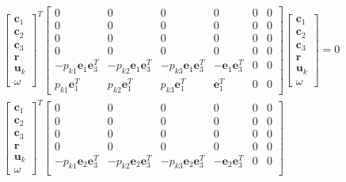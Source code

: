 \documentclass{article}
\begin{document}
\begin{align}
    \begin{bmatrix}
        \mathbf{c}_1 \\
        \mathbf{c}_2 \\
        \mathbf{c}_3 \\
        \mathbf{r} \\
        \mathbf{u}_k \\
        \omega
    \end{bmatrix}^T
    \begin{bmatrix}
        0 & 0 & 0 & 0 & 0 & 0 \\
        0 & 0 & 0 & 0 & 0 & 0 \\
        0 & 0 & 0 & 0 & 0 & 0 \\
        0 & 0 & 0 & 0 & 0 & 0 \\
        -p_{k1}\mathbf{e}_1\mathbf{e}_3^T & -p_{k2}\mathbf{e}_1\mathbf{e}_3^T & -p_{k3}\mathbf{e}_1\mathbf{e}_3^T & -\mathbf{e}_1\mathbf{e}_3^T & 0 & 0 \\
        p_{k1}\mathbf{e}_1^T & p_{k2}\mathbf{e}_1^T & p_{k3}\mathbf{e}_1^T & \mathbf{e}_1^T & 0 &0 
    \end{bmatrix} 
    \begin{bmatrix}
        \mathbf{c}_1 \\
        \mathbf{c}_2 \\
        \mathbf{c}_3 \\
        \mathbf{r} \\
        \mathbf{u}_k \\
        \omega
    \end{bmatrix} = 0 \\
    \begin{bmatrix}
        \mathbf{c}_1 \\
        \mathbf{c}_2 \\
        \mathbf{c}_3 \\
        \mathbf{r} \\
        \mathbf{u}_k \\
        \omega
    \end{bmatrix}^T
    \begin{bmatrix}
        0 & 0 & 0 & 0 & 0 & 0 \\
        0 & 0 & 0 & 0 & 0 & 0 \\
        0 & 0 & 0 & 0 & 0 & 0 \\
        0 & 0 & 0 & 0 & 0 & 0 \\
        -p_{k1}\mathbf{e}_2\mathbf{e}_3^T & -p_{k2}\mathbf{e}_2\mathbf{e}_3^T & -p_{k3}\mathbf{e}_2\mathbf{e}_3^T & -\mathbf{e}_2\mathbf{e}_3^T & 0 & 0 \\

\end{bmatrix}
\end{align}
\end{document}
